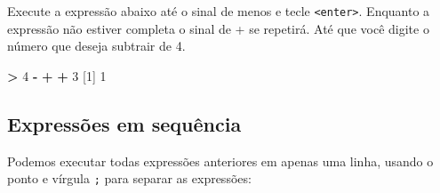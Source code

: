 \documentclass[]{book}
\newenvironment{Shaded}{\begin{snugshade}}{\end{snugshade}}
\newcommand{\DecValTok}[1]{\textcolor[rgb]{0.00,0.00,0.81}{#1}}
\newcommand{\StringTok}[1]{\textcolor[rgb]{0.31,0.60,0.02}{#1}}
\newcommand{\OperatorTok}[1]{\textcolor[rgb]{0.81,0.36,0.00}{\textbf{#1}}}
\newcommand{\NormalTok}[1]{#1}
\begin{document}
Execute a expressão abaixo até o sinal de menos e tecle
\texttt{\textless{}enter\textgreater{}}. Enquanto a expressão não
estiver completa o sinal de + se repetirá. Até que você digite o número
que deseja subtrair de 4.

\begin{Shaded}
\begin{Highlighting}[]
\OperatorTok{>}\StringTok{ }\DecValTok{4} \OperatorTok{-}
\OperatorTok{+}\StringTok{   }
\OperatorTok{+}\StringTok{   }\DecValTok{3}
\NormalTok{[}\DecValTok{1}\NormalTok{] }\DecValTok{1}
\end{Highlighting}
\end{Shaded}

\subsection{Expressões em sequência}\label{expressInSeq}

Podemos executar todas expressões anteriores em apenas uma linha, usando
o ponto e vírgula \texttt{;} para separar as expressões:
\end{document}
